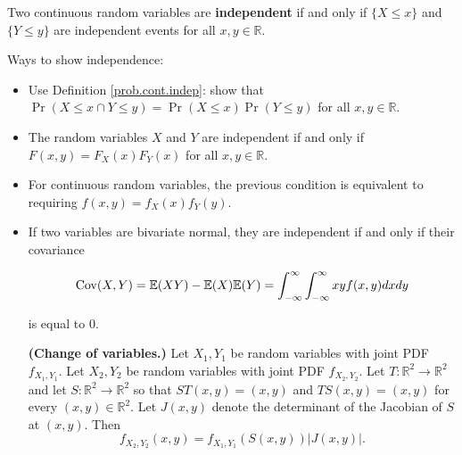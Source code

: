 \begin{definition} \label{prob.cont.indep} Two continuous random variables are \textbf{independent} if and only if \(\{X \leq x\}\) and \(\{Y \leq y\}\) are independent events for all \(x, y \in \mathbb{R}\). \end{definition}

Ways to show independence:

\begin{itemize}

\item Use Definition \ref{prob.cont.indep}: show that \(\Pr(X \leq x \cap Y \leq y) = \Pr(X \leq x) \Pr(Y \leq y)\) for all \(x, y \in \mathbb{R}\).

\item \begin{theorem}The random variables \(X\) and \(Y\) are independent if and only if  \(F(x, y) = F_X(x) F_Y(x)\) for all \(x, y \in \mathbb{R}\). \end{theorem}

\item \begin{proposition}For continuous random variables, the previous condition is equivalent to requiring \(f(x,y) = f_X(x) f_Y(y)\).\end{proposition}

\item \begin{theorem}\label{prob.bivariate.norm.indep} If two variables are bivariate normal, they are independent if and only if their covariance

\[
\mathrm{Cov}(X, Y) = \mathbb{E}(XY) - \mathbb{E}(X)\mathbb{E}(Y) = \int_{-\infty}^\infty \int_{-\infty}^\infty xy f(x, y) dx dy
\]

is equal to 0. \end{theorem}

\begin{theorem}\label{prob.change.vars} \textbf{(Change of variables.)} Let $X_{1},Y_{1}$ be random variables with joint PDF $f_{X_{1},Y_{1}}$.  Let $X_{2},Y_{2}$ be random variables with joint PDF $f_{X_{2},Y_{2}}$.  Let $T : \mathbb{R}^{2}\to\mathbb{R}^{2}$ and let $S : \mathbb{R}^{2}\to\mathbb{R}^{2}$ so that $ST(x,y)=(x,y)$ and $TS(x,y)=(x,y)$ for every $(x,y)\in\mathbb{R}^{2}$.  Let $J(x,y)$ denote the determinant of the Jacobian of $S$ at $(x,y)$.  Then
$$f_{X_{2},Y_{2}}(x,y)=f_{X_{1},Y_{1}}(S(x,y))\left|J(x,y)\right|.$$

%
%


\end{theorem}
\end{itemize}
